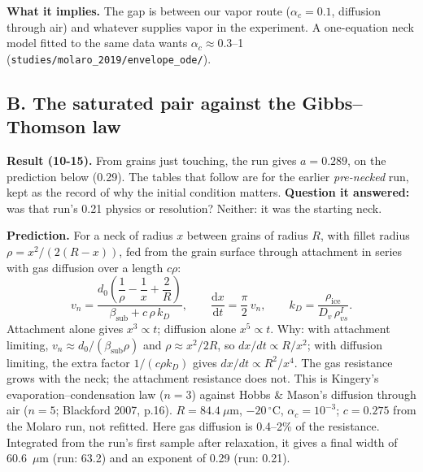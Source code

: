 \documentclass[11pt]{article}
\begin{document}
\textbf{What it implies.} The gap is between our vapor route ($\alpha_c =
0.1$, diffusion through air) and whatever supplies vapor in the experiment.
A one-equation neck model fitted to the same data wants $\alpha_c \approx
0.3$--1 (\texttt{studies/molaro\_2019/envelope\_ode/}).

\subsection*{B. The saturated pair against the Gibbs--Thomson law}

\textbf{Result (10-15).} From grains just touching, the run gives $a =
0.289$, on the prediction below (0.29). The tables that follow are for the
earlier \emph{pre-necked} run, kept as the record of why the initial
condition matters. \textbf{Question it answered:} was that run's 0.21
physics or resolution? Neither: it was the starting neck.

\textbf{Prediction.} For a neck of radius $x$ between grains of radius $R$,
with fillet radius $\rho = x^{2}/(2(R-x))$, fed from the grain surface
through attachment in series with gas diffusion over a length $c\rho$:
\[
v_n = \frac{d_0\left(\dfrac1\rho - \dfrac1x + \dfrac2R\right)}{\beta_{\mathrm{sub}} + c\,\rho\,k_D},\qquad
\frac{\mathrm dx}{\mathrm dt} = \frac{\pi}{2}\,v_n,\qquad k_D = \frac{\rho_{\mathrm{ice}}}{D_v\,\rho_{vs}^{I}} .
\]
Attachment alone gives $x^{3} \propto t$; diffusion alone $x^{5} \propto t$.
Why: with attachment limiting, $v_n \approx d_0/(\beta_{\mathrm{sub}}\rho)$
and $\rho \approx x^2/2R$, so $dx/dt \propto R/x^2$; with diffusion
limiting, the extra factor $1/(c\rho k_D)$ gives $dx/dt \propto R^2/x^4$.
The gas resistance grows with the neck; the attachment resistance does not.
This is Kingery's evaporation--condensation law ($n=3$) against Hobbs \&
Mason's diffusion through air ($n=5$; Blackford 2007, p.16).
$R = 84.4~\mu$m, $-20\,^{\circ}$C, $\alpha_c = 10^{-3}$; $c = 0.275$ from the
Molaro run, not refitted. Here gas diffusion is 0.4--2\% of the resistance.
Integrated from the run's first sample after relaxation, it gives a final
width of 60.6~$\mu$m (run: 63.2) and an exponent of 0.29 (run: 0.21).
\end{document}

